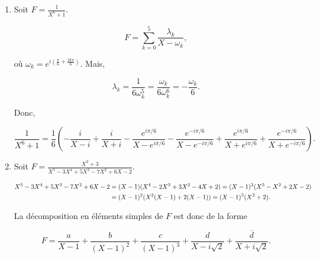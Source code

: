{{\begin{enumerate}
$$c=\lim_{z\rightarrow j}(z-j)(F(z)-1-\frac{1}{9}(\frac{1}{(z-1)^2}+\frac{j^2}{(z-j)^2}+\frac{j}{(z-j^2)^2})
=\frac{4}{3}\frac{1}{(j-1)(j-j^2)}=\frac{4j^2}{9}.$$
  
Donc,

$$F=1+\frac{1}{9}(\frac{4}{X-1}+\frac{1}{(X-1)^2}+\frac{4j^2}{X-j}+\frac{j^2}{(X-j)^2}+\frac{4j}{X-j^2}+\frac{j}{(X-j^2)^2}).$$

Si on veut la décomposition sur $\Rr$, on peut regrouper les conjugués~:

\begin{align*}\ensuremath
F&=1+\frac{1}{9}(\frac{4}{X-1}+\frac{1}{(X-1)^2}+\frac{4j^2(X-j^2)+4j(X-j)}
{X^2+X+1}+\frac{j^2(X-j^2)^2+j(X-j)^2}{(X^2+X+1)^2})\\
 &=1+\frac{1}{9}(\frac{4}{X-1}+\frac{1}{(X-1)^2}+\frac{-4X+4}{X^2+X+1}+\frac{-X^2+2X+2}{(X^2+X+1)^2})\\
 &=1+\frac{1}{9}(\frac{4}{X-1}+\frac{1}{(X-1)^2}+\frac{-4X+4}{X^2+X+1}+\frac{-X^2-X-1+3X+3}{(X^2+X+1)^2})\\
 &=1+\frac{1}{9}(\frac{4}{X-1}+\frac{1}{(X-1)^2}+\frac{-4X+3}{X^2+X+1}+\frac{3X+3}{(X^2+X+1)^2})
\end{align*}

\item  Soit $F=\frac{1}{X^6+1}$. 

$$F=\sum_{k=0}^{5}\frac{\lambda_k}{X-\omega_k},$$ 

où $\omega_k=e^{i(\frac{\pi}{6}+\frac{2k\pi}{6})}$. Mais, 

$$\lambda_k=\frac{1}{6\omega_k^5}=\frac{\omega_k}{6\omega_k^6}=-\frac{\omega_k}{6}.$$

Donc,

$$\frac{1}{X^6+1}=\frac{1}{6}(-\frac{i}{X-i}+\frac{i}{X+i}-\frac{e^{i\pi/6}}{X-e^{i\pi/6}}-\frac{e^{-i\pi/6}}{X-e^{-i\pi/6}}+
\frac{e^{i\pi/6}}{X+e^{i\pi/6}}+\frac{e^{-i\pi/6}}{X+e^{-i\pi/6}}).$$
\item  Soit $F=\frac{X^2+3}{X^5-3X^4+5X^3-7X^2+6X-2}$.

\begin{align*}\ensuremath
X^5-3X^4+5X^3-7X^2+6X-2&=(X-1)(X^4-2X^3+3X^2-4X+2)=(X-1)^2(X^3-X^2+2X-2)\\
 &= (X-1)^2(X^2(X-1)+2(X-1))=(X-1)^3(X^2+2).
\end{align*}

La décomposition en éléments simples de $F$ est donc de la forme

$$F=\frac{a}{X-1}+\frac{b}{(X-1)^2}+\frac{c}{(X-1)^3}+\frac{d}{X-i\sqrt{2}}+\frac{\overline{d}}{X+i\sqrt{2}}.$$


\end{enumerate}}}
